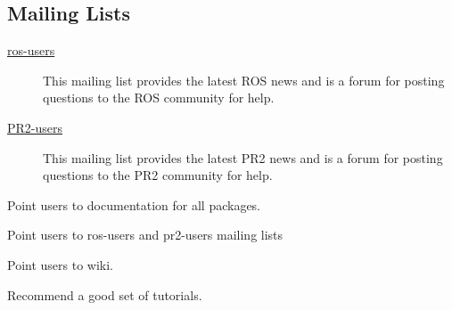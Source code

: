 \subsection{Mailing Lists}
\begin{description}
\item[\href{https://lists.sourceforge.net/lists/listinfo/ros-users}{ros-users}] This mailing list 
provides the latest ROS news and is a forum for posting questions to the ROS community for help. 
\item[\href{http://lists.willowgarage.com/cgi-bin/mailman/listinfo/pr2-users}{PR2-users}] This 
mailing list provides the latest PR2 news and is a forum for posting questions to the PR2 community 
for help.
\end{description}

Point users to documentation for all packages.

Point users to ros-users and pr2-users mailing lists

Point users to wiki.

Recommend a good set of tutorials.
